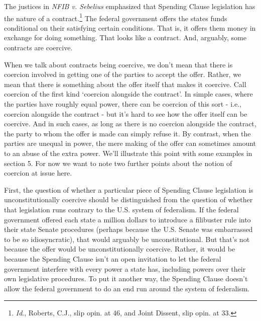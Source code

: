 \documentclass[
  11pt,
  letterpaper,
  DIV=11,
  numbers=noendperiod,
  twoside]{scrartcl}
\begin{document}
The justices in \emph{NFIB v. Sebelius} emphasized that Spending Clause
legislation has the nature of a contract.\footnote{\emph{Id}., Roberts,
  C.J., slip opin. at 46, and Joint Dissent, slip opin. at 33.} The
federal government offers the states funds conditional on their
satisfying certain conditions. That is, it offers them money in exchange
for doing something. That looks like a contract. And, arguably, some
contracts are coercive.

When we talk about contracts being coercive, we don't mean that there is
coercion involved in getting one of the parties to accept the offer.
Rather, we mean that there is something about the offer itself that
makes it coercive. Call coercion of the first kind `coercion alongside
the contract'. In simple cases, where the parties have roughly equal
power, there can be coercion of this sort - i.e., coercion alongside the
contract - but it's hard to see how the offer itself can be coercive.
And in such cases, as long as there is no coercion alongside the
contract, the party to whom the offer is made can simply refuse it. By
contrast, when the parties are unequal in power, the mere making of the
offer can sometimes amount to an abuse of the extra power. We'll
illustrate this point with some examples in section 5. For now we want
to note two further points about the notion of coercion at issue here.

First, the question of whether a particular piece of Spending Clause
legislation is unconstitutionally coercive should be distinguished from
the question of whether that legislation runs contrary to the U.S.
system of federalism. If the federal government offered each state a
million dollars to introduce a filibuster rule into their state Senate
procedures (perhaps because the U.S. Senate was embarrassed to be so
idiosyncratic), that would arguably be unconstitutional. But that's not
because the offer would be unconstitutionally coercive. Rather, it would
be because the Spending Clause isn't an open invitation to let the
federal government interfere with every power a state has, including
powers over their own legislative procedures. To put it another way, the
Spending Clause doesn't allow the federal government to do an end run
around the system of federalism.
\end{document}
